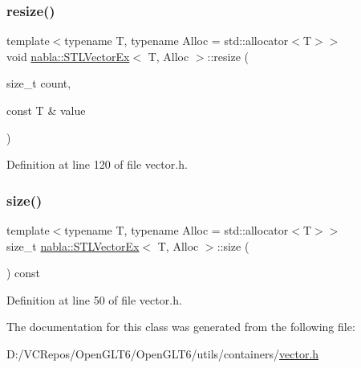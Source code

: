 \mbox{\label{classnabla_1_1_s_t_l_vector_ex_a86b60bb70244ff2cdcefb10617cc2ec7}} 
\subsubsection{\texorpdfstring{resize()}{resize()}\hspace{0.1cm}{\footnotesize\ttfamily [2/2]}}
{\footnotesize\ttfamily template$<$typename T, typename Alloc = std\+::allocator$<$\+T$>$$>$ \\
void \mbox{\hyperlink{classnabla_1_1_s_t_l_vector_ex}{nabla\+::\+S\+T\+L\+Vector\+Ex}}$<$ T, Alloc $>$\+::resize (\begin{DoxyParamCaption}\item[{size\+\_\+t}]{count,  }\item[{const T \&}]{value }\end{DoxyParamCaption})\hspace{0.3cm}{\ttfamily [inline]}}



Definition at line 120 of file vector.\+h.

\mbox{\label{classnabla_1_1_s_t_l_vector_ex_a1b4a4d968613137772046331b1264e1f}} 
\subsubsection{\texorpdfstring{size()}{size()}}
{\footnotesize\ttfamily template$<$typename T, typename Alloc = std\+::allocator$<$\+T$>$$>$ \\
size\+\_\+t \mbox{\hyperlink{classnabla_1_1_s_t_l_vector_ex}{nabla\+::\+S\+T\+L\+Vector\+Ex}}$<$ T, Alloc $>$\+::size (\begin{DoxyParamCaption}{ }\end{DoxyParamCaption}) const\hspace{0.3cm}{\ttfamily [inline]}}



Definition at line 50 of file vector.\+h.



The documentation for this class was generated from the following file\+:\begin{DoxyCompactItemize}
\item 
D\+:/\+V\+C\+Repos/\+Open\+G\+L\+T6/\+Open\+G\+L\+T6/utils/containers/\mbox{\hyperlink{vector_8h}{vector.\+h}}\end{DoxyCompactItemize}
